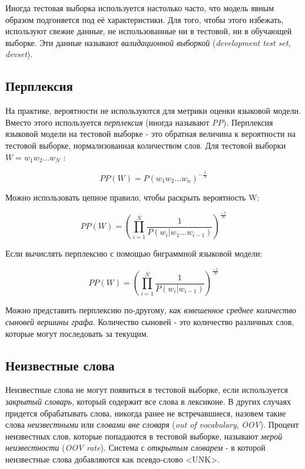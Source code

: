 \documentclass[a4paper,12pt,preview]{report} %
\begin{document}
	Иногда тестовая выборка используется настолько часто, что модель явным образом подгоняется под её характеристики. Для того, чтобы этого избежать, используют свежие данные, не использованные ни в тестовой, ни в обучающей выборке. Эти данные называют \textit{валидационной выборкой} (\textit{development test set}, \textit{devset}). 
	
	\subsection{Перплексия}
	На практике, вероятности не используются для метрики оценки языковой модели. Вместо этого используется \textit{перплексия} (иногда называют \textit{PP}). Перплексия языковой модели на тестовой выборке - это обратная величина к вероятности на тестовой выборке, нормализованная количеством слов. Для тестовой выборки $W = w_1 w_2 \dots w_N$ :
	
	\begin{equation}
		PP(W) = P(w_1 w_2 \dots w_n)^{-\frac{1}{N}}
	\end{equation}
	
	Можно использовать цепное правило, чтобы раскрыть вероятность W:
	
	\begin{equation}
		PP(W) = (\prod_{i=1}^{N} \frac{1}{P(w_i | w_1 \dots w_{i-1})})^{\frac{-1}{N}}
	\end{equation}
	
	Если вычислять перплексию с помощью биграммной языковой модели:
	
	
	\begin{equation}
		PP(W) = (\prod_{i=1}^{N} \frac{1}{P(w_i | w_{i-1})})^{\frac{-1}{N}}
	\end{equation}
	
	Можно представить перплексию по-другому, \textit{как взвешенное среднее количество сыновей вершины графа}. Количество сыновей - это количество различных слов, которые могут последовать за текущим.
	
	\subsection{Неизвестные слова}
	Неизвестные слова не могут появиться в тестовой выборке, если используется \textit{закрытый словарь}, который содержит все слова в лексиконе. В других случаях придется обрабатывать слова, никогда ранее не встречавшиеся, назовем такие слова \textit{неизвестными} или \textit{словами вне словаря} (\textit{out of vocabulary}, \textit{OOV}). Процент неизвестных слов, которые попадаются в тестовой выборке, называют \textit{мерой неизвестности} (\textit{OOV rate}). Система с \textit{открытым словарем} - в которой неизвестные слова добавляются как псевдо-слово <UNK>.
	
\end{document}
